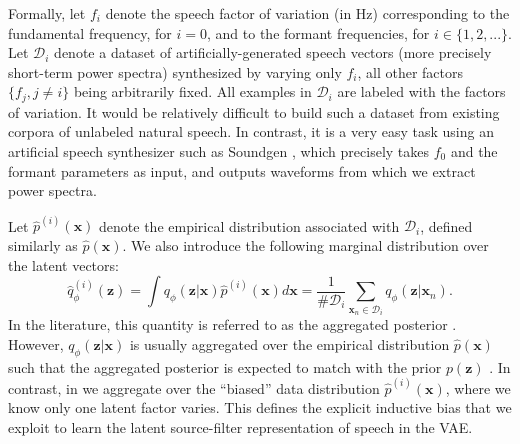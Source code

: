 \documentclass[review]{elsarticle}
\begin{document}
Formally, let $f_i$ denote the speech factor of variation (in Hz) corresponding to the fundamental frequency, for $i=0$, and to the formant frequencies, for $i \in \{ 1, 2, ... \}$. Let $\mathcal{D}_i$ denote a dataset of artificially-generated speech vectors (more precisely short-term power spectra) synthesized by varying only $f_i$, all other factors $\{f_j, j \neq i\}$ being arbitrarily fixed. All examples in $\mathcal{D}_i$ are labeled with the factors of variation. It would be relatively difficult to build such a dataset from existing corpora of unlabeled natural speech. In contrast, it is a very easy task using an artificial speech synthesizer such as Soundgen \citep{Anikin2019}, which precisely takes $f_0$ and the formant parameters as input, and outputs waveforms from which we extract power spectra. 

Let $\hat{p}^{(i)}(\mathbf{x})$ denote the empirical distribution associated with $\mathcal{D}_i$, defined similarly as $\hat{p}(\mathbf{x})$. We also introduce the following marginal distribution over the latent vectors:
\begin{equation}
    \hat{q}_\phi^{(i)}(\mathbf{z}) = \int q_\phi(\mathbf{z} | \mathbf{x}) \hat{p}^{(i)}(\mathbf{x}) d\mathbf{x} = \frac{1}{\# \mathcal{D}_i} \sum_{\mathbf{x}_n \in \mathcal{D}_i} q_\phi(\mathbf{z} | \mathbf{x}_n).
    \label{agg_posterior}
\end{equation}
In the literature, this quantity is referred to as the aggregated posterior \citep{makhzani2015adversarial}. However, $q_\phi(\mathbf{z} | \mathbf{x})$ is usually aggregated over the empirical distribution $\hat{p}(\mathbf{x})$ such that the aggregated posterior is expected to match with the prior $p(\mathbf{z})$ \citep{chen2018isolating, dai2018diagnosing}. In contrast, in  we aggregate over the ``biased'' data distribution $\hat{p}^{(i)}(\mathbf{x})$, where we know only one latent factor varies. This defines the explicit inductive bias \citep{locatello2019challenging} that we exploit to learn the latent source-filter representation of speech in the VAE.
\end{document}
